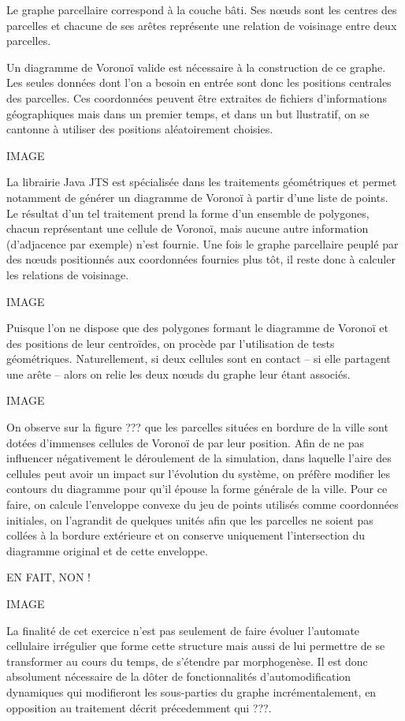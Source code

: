 \documentclass[10pt]{article}
\begin{document}
Le graphe parcellaire correspond à la couche bâti. Ses n\oe uds sont
les centres des parcelles et chacune de ses arêtes représente une
relation de voisinage entre deux parcelles.

Un diagramme de Voronoï valide est nécessaire à la construction de ce
graphe. Les seules données dont l'on a besoin en entrée sont donc les
positions centrales des parcelles. Ces coordonnées peuvent être
extraites de fichiers d'informations géographiques mais dans un
premier temps, et dans un but llustratif, on se cantonne à utiliser
des positions aléatoirement choisies.

IMAGE

La librairie Java JTS est spécialisée dans les traitements
géométriques et permet notamment de générer un diagramme de Voronoï à
partir d'une liste de points. Le résultat d'un tel traitement prend la
forme d'un ensemble de polygones, chacun représentant une cellule de
Voronoï, mais aucune autre information (d'adjacence par exemple) n'est
fournie. Une fois le graphe parcellaire peuplé par des n\oe uds
positionnés aux coordonnées fournies plus tôt, il reste donc à
calculer les relations de voisinage.

IMAGE

Puisque l'on ne dispose que des polygones formant le diagramme de
Voronoï et des positions de leur centroïdes, on procède par
l'utilisation de tests géométriques. Naturellement, si deux cellules
sont en contact -- si elle partagent une arête -- alors on relie les
deux n\oe uds du graphe leur étant associés.

IMAGE

On observe sur la figure ??? que les parcelles situées en bordure de
la ville sont dotées d'immenses cellules de Voronoï de par leur
position. Afin de ne pas influencer négativement le déroulement de la
simulation, dans laquelle l'aire des cellules peut avoir un impact sur
l'évolution du système, on préfère modifier les contours du diagramme
pour qu'il épouse la forme générale de la ville. Pour ce faire, on
calcule l'enveloppe convexe du jeu de points utilisés comme
coordonnées initiales, on l'agrandit de quelques unités afin que les
parcelles ne soient pas collées à la bordure extérieure et on conserve
uniquement l'intersection du diagramme original et de cette enveloppe.

EN FAIT, NON !

IMAGE

La finalité de cet exercice n'est pas seulement de faire évoluer
l'automate cellulaire irrégulier que forme cette structure mais aussi
de lui permettre de se transformer au cours du temps, de s'étendre par
morphogenèse. Il est donc absolument nécessaire de la dôter de
fonctionnalités d'automodification dynamiques qui modifieront les
sous-parties du graphe incrémentalement, en opposition au traitement
décrit précedemment qui ???.
\end{document}
